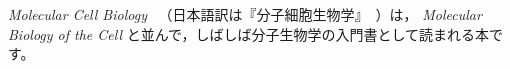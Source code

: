 \documentclass[11pt]{jsarticle}
\begin{document}
\textit{Molecular Cell Biology}~\cite{book2} （日本語訳は『分子細胞生物学』~\cite{book1}）は，
\textit{Molecular Biology of the Cell} と並んで，しばしば分子生物学の入門書として読まれる本です。



\end{document}
